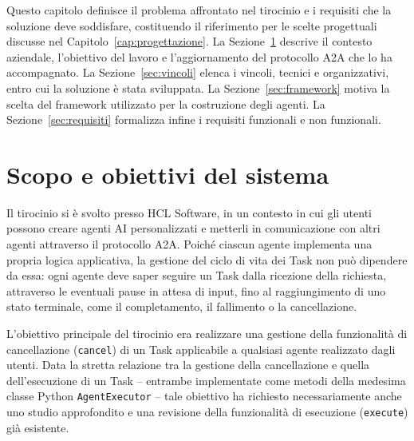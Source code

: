 \label{cap:requisiti}

Questo capitolo definisce il problema affrontato nel tirocinio e i requisiti che la soluzione deve soddisfare, costituendo il riferimento per le scelte progettuali discusse nel Capitolo~\ref{cap:progettazione}. La Sezione~\ref{sec:scopo} descrive il contesto aziendale, l'obiettivo del lavoro e l'aggiornamento del protocollo A2A che lo ha accompagnato. La Sezione~\ref{sec:vincoli} elenca i vincoli, tecnici e organizzativi, entro cui la soluzione è stata sviluppata. La Sezione~\ref{sec:framework} motiva la scelta del framework utilizzato per la costruzione degli agenti. La Sezione~\ref{sec:requisiti} formalizza infine i requisiti funzionali e non funzionali.

\section{Scopo e obiettivi del sistema}
\label{sec:scopo}

Il tirocinio si è svolto presso HCL Software, in un contesto in cui gli utenti possono creare agenti AI personalizzati e metterli in comunicazione con altri agenti attraverso il protocollo A2A. Poiché ciascun agente implementa una propria logica applicativa, la gestione del ciclo di vita dei Task non può dipendere da essa: ogni agente deve saper seguire un Task dalla ricezione della richiesta, attraverso le eventuali pause in attesa di input, fino al raggiungimento di uno stato terminale, come il completamento, il fallimento o la cancellazione.

L'obiettivo principale del tirocinio era realizzare una gestione della funzionalità di cancellazione (\texttt{cancel}) di un Task applicabile a qualsiasi agente realizzato dagli utenti. Data la stretta relazione tra la gestione della cancellazione e quella dell'esecuzione di un Task -- entrambe implementate come metodi della medesima classe Python \texttt{AgentExecutor} -- tale obiettivo ha richiesto necessariamente anche uno studio approfondito e una revisione della funzionalità di esecuzione (\texttt{execute}) già esistente.

